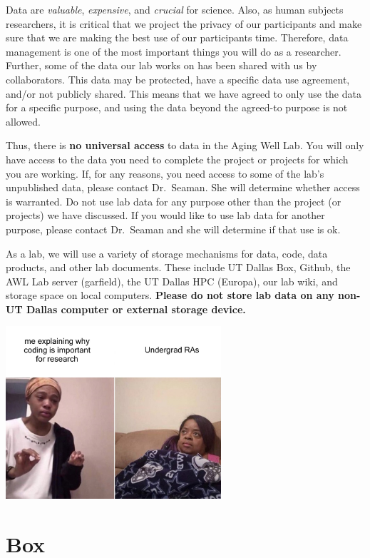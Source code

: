 \documentclass[
]{book}
\begin{document}
Data are \emph{valuable}, \emph{expensive}, and \emph{crucial} for science. Also, as human subjects researchers, it is critical that we project the privacy of our participants and make sure that we are making the best use of our participants time. Therefore, data management is one of the most important things you will do as a researcher. Further, some of the data our lab works on has been shared with us by collaborators. This data may be protected, have a specific data use agreement, and/or not publicly shared. This means that we have agreed to only use the data for a specific purpose, and using the data beyond the agreed-to purpose is not allowed.

Thus, there is \textbf{no universal access} to data in the Aging Well Lab. You will only have access to the data you need to complete the project or projects for which you are working. If, for any reasons, you need access to some of the lab's unpublished data, please contact Dr.~Seaman. She will determine whether access is warranted. Do not use lab data for any purpose other than the project (or projects) we have discussed. If you would like to use lab data for another purpose, please contact Dr.~Seaman and she will determine if that use is ok.

As a lab, we will use a variety of storage mechanisms for data, code, data products, and other lab documents. These include UT Dallas Box, Github, the AWL Lab server (garfield), the UT Dallas HPC (Europa), our lab wiki, and storage space on local computers. \textbf{Please do not store lab data on any non-UT Dallas computer or external storage device.}

\includegraphics[width=0.6\textwidth,height=\textheight]{images/coding_meme.jpg}

\hypertarget{box}{%
\section{Box}\label{box}}
\end{document}

